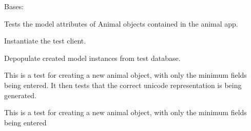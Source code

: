 \documentclass[letterpaper,10pt,english]{sphinxmanual}
\begin{document}
\begin{fulllineitems}
\label{api:mousedb.animal.tests.AnimalModelTests}
Bases: 

Tests the model attributes of Animal objects contained in the animal app.

\begin{fulllineitems}
\label{api:mousedb.animal.tests.AnimalModelTests.fixtures}
\end{fulllineitems}


\begin{fulllineitems}
\label{api:mousedb.animal.tests.AnimalModelTests.setUp}
Instantiate the test client.

\end{fulllineitems}


\begin{fulllineitems}
\label{api:mousedb.animal.tests.AnimalModelTests.tearDown}
Depopulate created model instances from test database.

\end{fulllineitems}


\begin{fulllineitems}
\label{api:mousedb.animal.tests.AnimalModelTests.test_animal_unicode}
This is a test for creating a new animal object, with only the minimum fields being entered.  It then tests that the correct unicode representation is being generated.

\end{fulllineitems}


\begin{fulllineitems}
\label{api:mousedb.animal.tests.AnimalModelTests.test_create_animal_minimal}
This is a test for creating a new animal object, with only the minimum fields being entered

\end{fulllineitems}


\end{fulllineitems}
\end{document}
